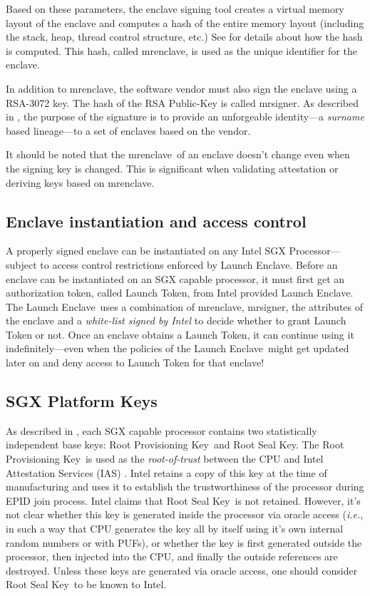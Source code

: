 \documentclass[letterpaper]{article}
\newcommand{\ie}{\textit{i.e.}}
\newcommand{\mrenclave}{\textsf{mrenclave}}
\newcommand{\mrsigner}{\textsf{mrsigner}}
\newcommand{\launchenclave}{\textsf{Launch Enclave}}
\newcommand{\rpk}{\textsf{Root Provisioning Key}}
\newcommand{\rsk}{\textsf{Root Seal Key}}
\begin{document}
  Based on these parameters, the enclave signing tool creates a
  virtual memory layout of the enclave and computes a hash of the
  entire memory layout (including the stack, heap, thread control
  structure, etc.)  See \cite{intelsdm} for details about how the hash
  is computed. This hash, called \mrenclave, is used as the unique
  identifier for the enclave.

  In addition to \mrenclave, the software vendor must also sign the
  enclave using a RSA-3072 key. The hash of the RSA Public-Key is
  called \mrsigner. As described in \cite{surnaming}, the purpose of
  the signature is to provide an unforgeable identity---a
  \textit{surname} based lineage---to a set of enclaves based on the
  vendor.

  It should be noted that the \mrenclave\ of an enclave doesn't change
  even when the signing key is changed. This is significant when
  validating attestation or deriving keys based on \mrenclave.

  \subsection{Enclave instantiation and access control}

  A properly signed enclave can be instantiated on any Intel SGX
  Processor---subject to access control restrictions enforced by
  \launchenclave. Before an enclave can be instantiated on an SGX
  capable processor, it must first get an authorization token, called
  \textsf{Launch Token}, from Intel provided \launchenclave. The
  \launchenclave\ uses a combination of \mrenclave, \mrsigner, the
  attributes of the enclave and a \textit{white-list signed by Intel}
  to decide whether to grant \textsf{Launch Token} or not. Once an
  enclave obtains a \textsf{Launch Token}, it can continue
  using it indefinitely---even when the policies of the
  \launchenclave\ might get updated later on and deny access to
  \textsf{Launch Token} for that enclave!

  \subsection{SGX Platform Keys}
  \label{ssec:platkeys}

  As described in \cite{sgxattest}, each SGX capable processor
  contains two statistically independent base keys: \rpk\ and \rsk.
  The \rpk\ is used as the \textit{root-of-trust} between the CPU and
  Intel Attestation Services (IAS) \cite{ias}. Intel retains a copy of
  this key at the time of manufacturing and uses it to establish the
  trustworthiness of the processor during EPID join process. Intel
  claims that \rsk\ is not retained. However, it's not clear whether
  this key is generated inside the processor via oracle access (\ie,
  in such a way that CPU generates the key all by itself using it's
  own internal random numbers or with PUFs), or whether the key is
  first generated outside the processor, then injected into the CPU,
  and finally the outside references are destroyed. Unless these keys
  are generated via oracle access, one should consider \rsk\ to be
  known to Intel.
\end{document}
